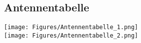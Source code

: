 \newpage
\subsection{Antennentabelle}\label{sec:Antennentabelle}
\begin{minipage}{1.7\columnwidth}
    \texttt{[image: Figures/Antennentabelle\_1.png]}\\
    \texttt{[image: Figures/Antennentabelle\_2.png]}
\end{minipage}